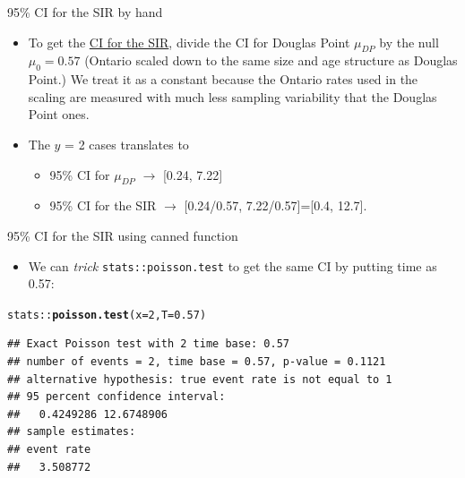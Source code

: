 \documentclass[10pt,handout]{beamer}\usepackage[]{graphicx}\usepackage[]{color}
\makeatletter
\newcommand{\hlnum}[1]{\textcolor[rgb]{0.686,0.059,0.569}{#1}}%
\newcommand{\hlopt}[1]{\textcolor[rgb]{0,0,0}{#1}}%
\newcommand{\hlstd}[1]{\textcolor[rgb]{0.345,0.345,0.345}{#1}}%
\newcommand{\hlkwc}[1]{\textcolor[rgb]{0.333,0.667,0.333}{#1}}%
\newcommand{\hlkwd}[1]{\textcolor[rgb]{0.737,0.353,0.396}{\textbf{#1}}}%
\newenvironment{kframe}{%
 \def\at@end@of@kframe{}%
 \ifinner\ifhmode%
  \def\at@end@of@kframe{\end{minipage}}%
  \begin{minipage}{\columnwidth}%
 \fi\fi%
 \def\FrameCommand##1{\hskip\@totalleftmargin \hskip-\fboxsep
 \colorbox{shadecolor}{##1}\hskip-\fboxsep
     \hskip-\linewidth \hskip-\@totalleftmargin \hskip\columnwidth}%
 \MakeFramed {\advance\hsize-\width
   \@totalleftmargin\z@ \linewidth\hsize
   \@setminipage}}%
 {\par\unskip\endMakeFramed%
 \at@end@of@kframe}
\newenvironment{knitrout}{}{} %
\makeatother
\begin{document}
\begin{frame}[fragile]{95\% CI for the SIR by hand}
	
	
	\small
	\begin{itemize}
		\setlength\itemsep{1.2em}
		
		\item To get the \underline{CI for the SIR}, divide the CI for Douglas Point $\mu_{DP}$ by the null $\mu_0 = 0.57$ (Ontario scaled down to the same size and age structure as Douglas Point.) We treat it as a constant because the Ontario rates used in the scaling are measured with much less sampling variability that the Douglas Point ones.
		
		\pause 
		
		\item The $y$ = 2 cases translates to
		\begin{itemize}
			\item 95\% CI for $\mu_{DP}$ $\to$ [0.24, 7.22]
			\item 95\% CI for the SIR $\to$ [0.24/0.57, 7.22/0.57]=[0.4, 12.7].
		\end{itemize}
	\end{itemize}
	
\end{frame}



\begin{frame}[fragile]{95\% CI for the SIR using canned function}
	
	
	\small
	\begin{itemize}
		\setlength\itemsep{1.2em}
		
		\item We can \textit{trick}  \texttt{stats::poisson.test} 
		to get the same CI by putting time as 0.57: 
		
		
	\end{itemize}
	
\begin{knitrout}\tiny
{}\color{fgcolor}\begin{kframe}
\begin{alltt}
\hlstd{stats}\hlopt{::}\hlkwd{poisson.test}\hlstd{(}\hlkwc{x}\hlstd{=}\hlnum{2}\hlstd{,}\hlkwc{T}\hlstd{=}\hlnum{0.57}\hlstd{)}
\end{alltt}
\begin{verbatim}
## Exact Poisson test with 2 time base: 0.57 
## number of events = 2, time base = 0.57, p-value = 0.1121
## alternative hypothesis: true event rate is not equal to 1 
## 95 percent confidence interval:
##   0.4249286 12.6748906 
## sample estimates:
## event rate 
##   3.508772
\end{verbatim}
\end{kframe}
\end{knitrout}
	
\end{frame}
\end{document}
